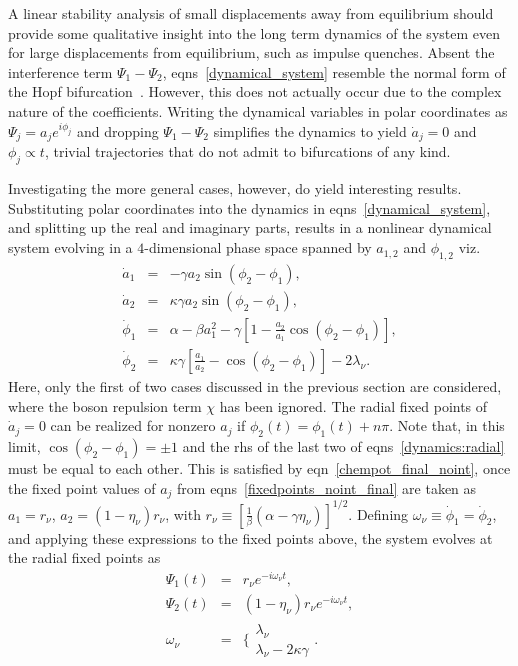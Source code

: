 \documentclass[a4paper,10pt]{article}
\begin{document}
A linear stability analysis of small displacements away from equilibrium should provide some qualitative insight into the long term dynamics of the system even for large displacements from equilibrium, such as impulse quenches. Absent the interference term $\Psi_1-\Psi_2$, eqns~\ref{dynamical_system} resemble the normal form of the Hopf bifurcation~\cite{strogatz:book}. However, this does not actually occur due to the complex nature of the coefficients. Writing the dynamical variables in polar coordinates as $\Psi_j = a_j e^{i\phi_j}$ and dropping $\Psi_1-\Psi_2$ simplifies the dynamics to yield $\dot{a}_j=0$ and $\phi_j\propto t$, trivial trajectories that do not admit to bifurcations of any kind. 

Investigating the more general cases, however, do yield interesting results. Substituting polar coordinates into the dynamics in eqns~\ref{dynamical_system}, and splitting up the real and imaginary parts, results in a nonlinear dynamical system evolving in a $4$-dimensional phase space spanned by $a_{1,2}$ and $\phi_{1,2}$ viz.
\begin{eqnarray}
\label{dynamics:radial}
\dot{a}_1 &=& -\gamma a_2 \sin{\left(\phi_2-\phi_1\right)},\nonumber \\
\dot{a}_2 &=& \kappa \gamma a_2 \sin{\left(\phi_2-\phi_1\right)},\nonumber \\
\dot{\phi}_1 &=& \alpha - \beta a^2_1 - \gamma\left[1-\frac{a_2}{a_1}\cos{\left(\phi_2-\phi_1\right)} \right],\nonumber \\
\dot{\phi}_2&=& \kappa\gamma\left[\frac{a_1}{a_2}-\cos{\left(\phi_2-\phi_1\right)} \right]-2\lambda_\nu.
\end{eqnarray}
Here, only the first of two cases discussed in the previous section are considered, where the boson repulsion term $\chi$ has been ignored. The radial fixed points of $\dot{a}_j=0$ can be realized for nonzero $a_j$ if $\phi_2(t) = \phi_1(t)+n\pi$.  Note that, in this limit, $\cos{\left(\phi_2-\phi_1\right)}=\pm 1$ and the rhs of the last two of eqns~\ref{dynamics:radial} must be equal to each other. This is satisfied by eqn~\ref{chempot_final_noint}, once the fixed point values of $a_j$ from eqns~\ref{fixedpoints_noint_final} are taken as $a_1=r_\nu$, $a_2=(1-\eta_\nu)r_\nu$, with $r_\nu \equiv\left[\frac{1}{\beta}\left(\alpha -\gamma\eta_\nu \right)\right]^{1/2}$. Defining $\omega_\nu\equiv\dot{\phi}_1=\dot{\phi}_2$, and applying these expressions to the fixed points above, the system evolves at the radial fixed points as
\begin{eqnarray}
 \Psi_1(t) &=& r_\nu e^{-i\omega_\nu t},\nonumber \\
 \Psi_2(t) &=& (1-\eta_\nu)r_\nu e^{-i\omega_\nu t},\nonumber \\
\omega_\nu &=& \bigg\{\begin{array}{l}
                         \lambda_\nu\\
			 \lambda_\nu - 2\kappa\gamma 
                       \end{array}.
\end{eqnarray}
\end{document}

